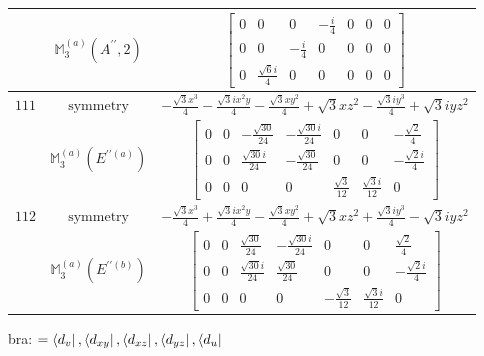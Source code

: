 \documentclass[fleqn,8pt,landscape]{jsarticle}
\begin{document}
\begin{longtable}{ccc}
$  $ & $ \mathbb{M}_{3}^{(a)}(A^{\prime\prime},2) $ & $ \begin{bmatrix} 0 & 0 & 0 & - \frac{i}{4} & 0 & 0 & 0 \\ 0 & 0 & - \frac{i}{4} & 0 & 0 & 0 & 0 \\ 0 & \frac{\sqrt{6} i}{4} & 0 & 0 & 0 & 0 & 0 \end{bmatrix} $ \\ \hline
$ 111 $ & $ \text{symmetry} $ & $ - \frac{\sqrt{3} x^{3}}{4} - \frac{\sqrt{3} i x^{2} y}{4} - \frac{\sqrt{3} x y^{2}}{4} + \sqrt{3} x z^{2} - \frac{\sqrt{3} i y^{3}}{4} + \sqrt{3} i y z^{2} $ \\
$  $ & $ \mathbb{M}_{3}^{(a)}(E^{\prime\prime(a)}) $ & $ \begin{bmatrix} 0 & 0 & - \frac{\sqrt{30}}{24} & - \frac{\sqrt{30} i}{24} & 0 & 0 & - \frac{\sqrt{2}}{4} \\ 0 & 0 & \frac{\sqrt{30} i}{24} & - \frac{\sqrt{30}}{24} & 0 & 0 & - \frac{\sqrt{2} i}{4} \\ 0 & 0 & 0 & 0 & \frac{\sqrt{3}}{12} & \frac{\sqrt{3} i}{12} & 0 \end{bmatrix} $ \\ \hline
$ 112 $ & $ \text{symmetry} $ & $ - \frac{\sqrt{3} x^{3}}{4} + \frac{\sqrt{3} i x^{2} y}{4} - \frac{\sqrt{3} x y^{2}}{4} + \sqrt{3} x z^{2} + \frac{\sqrt{3} i y^{3}}{4} - \sqrt{3} i y z^{2} $ \\
$  $ & $ \mathbb{M}_{3}^{(a)}(E^{\prime\prime(b)}) $ & $ \begin{bmatrix} 0 & 0 & \frac{\sqrt{30}}{24} & - \frac{\sqrt{30} i}{24} & 0 & 0 & \frac{\sqrt{2}}{4} \\ 0 & 0 & \frac{\sqrt{30} i}{24} & \frac{\sqrt{30}}{24} & 0 & 0 & - \frac{\sqrt{2} i}{4} \\ 0 & 0 & 0 & 0 & - \frac{\sqrt{3}}{12} & \frac{\sqrt{3} i}{12} & 0 \end{bmatrix} $ \\ \hline
\end{longtable}
bra: $=\bra{d_{v}}, \bra{d_{xy}}, \bra{d_{xz}}, \bra{d_{yz}}, \bra{d_{u}}$
\end{document}
